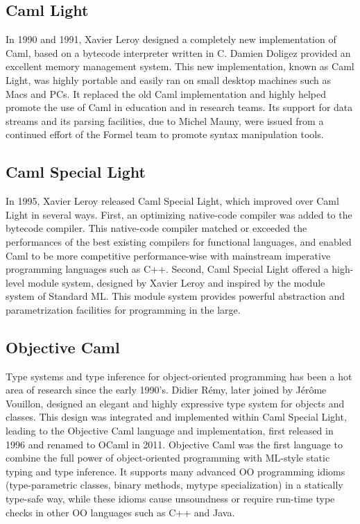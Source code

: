 \documentclass[14pt]{matmex-diploma-custom}
\begin{document}
\subsection{Caml Light}
In 1990 and 1991, Xavier Leroy designed a completely new implementation of Caml, based on a bytecode interpreter written in C. Damien Doligez provided an excellent memory management system. This new implementation, known as Caml Light, was highly portable and easily ran on small desktop machines such as Macs and PCs. It replaced the old Caml implementation and highly helped promote the use of Caml in education and in research teams. Its support for data streams and its parsing facilities, due to Michel Mauny, were issued from a continued effort of the Formel team to promote syntax manipulation tools.
\subsection{Caml Special Light}
In 1995, Xavier Leroy released Caml Special Light, which improved over Caml Light in several ways. First, an optimizing native-code compiler was added to the bytecode compiler. This native-code compiler matched or exceeded the performances of the best existing compilers for functional languages, and enabled Caml to be more competitive performance-wise with mainstream imperative programming languages such as C++. Second, Caml Special Light offered a high-level module system, designed by Xavier Leroy and inspired by the module system of Standard ML. This module system provides powerful abstraction and parametrization facilities for programming in the large.
\subsection{Objective Caml}
Type systems and type inference for object-oriented programming has been a hot area of research since the early 1990's. Didier Rémy, later joined by Jérôme Vouillon, designed an elegant and highly expressive type system for objects and classes. This design was integrated and implemented within Caml Special Light, leading to the Objective Caml language and implementation, first released in 1996 and renamed to OCaml in 2011. Objective Caml was the first language to combine the full power of object-oriented programming with ML-style static typing and type inference. It supports many advanced OO programming idioms (type-parametric classes, binary methods, mytype specialization) in a statically type-safe way, while these idioms cause unsoundness or require run-time type checks in other OO languages such as C++ and Java.
\end{document}
